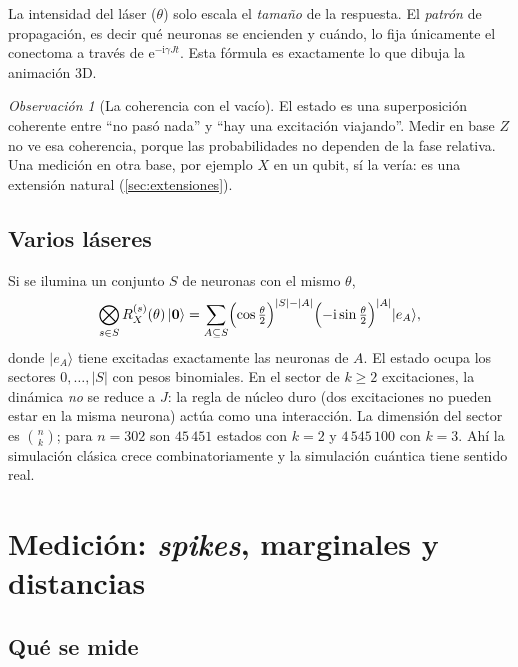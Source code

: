 \documentclass[11pt,a4paper]{article}
\renewcommand{\ket}[1]{\lvert #1\rangle}
\newcommand{\vac}{\ket{\mathbf{0}}}
\newcommand{\e}{\mathrm{e}}
\newcommand{\ii}{\mathrm{i}}
\newcommand{\RX}{R_X}
\theoremstyle{plain}
\theoremstyle{definition}
\theoremstyle{remark}
\newtheorem*{observacion}{Observación}
\begin{document}
\begin{idea}
La intensidad del láser ($\theta$) solo escala el \emph{tamaño} de la respuesta. El \emph{patrón} de propagación, es decir qué neuronas se encienden y cuándo, lo fija únicamente el conectoma a través de $\e^{-\ii\gamma Jt}$. Esta fórmula es exactamente lo que dibuja la animación 3D.
\end{idea}

\begin{observacion}[La coherencia con el vacío]
El estado es una superposición coherente entre ``no pasó nada'' y ``hay una excitación viajando''. Medir en base $Z$ no ve esa coherencia, porque las probabilidades no dependen de la fase relativa. Una medición en otra base, por ejemplo $X$ en un qubit, sí la vería: es una extensión natural (\cref{sec:extensiones}).
\end{observacion}

\subsection{Varios láseres}
\label{subsec:varios-laseres}

Si se ilumina un conjunto $S$ de neuronas con el mismo $\theta$,
\begin{equation}
\bigotimes_{s\in S}\RX^{(s)}(\theta)\,\vac
= \sum_{A\subseteq S}\Bigl(\cos\tfrac\theta2\Bigr)^{|S|-|A|}\Bigl(-\ii\sin\tfrac\theta2\Bigr)^{|A|}\ket{e_A},
\end{equation}
donde $\ket{e_A}$ tiene excitadas exactamente las neuronas de $A$. El estado ocupa los sectores $0,\dots,|S|$ con pesos binomiales. En el sector de $k\ge2$ excitaciones, la dinámica \emph{no} se reduce a $J$: la regla de núcleo duro (dos excitaciones no pueden estar en la misma neurona) actúa como una interacción. La dimensión del sector es $\binom nk$; para $n=302$ son $45\,451$ estados con $k=2$ y $4\,545\,100$ con $k=3$. Ahí la simulación clásica crece combinatoriamente y la simulación cuántica tiene sentido real.

\section{Medición: \emph{spikes}, marginales y distancias}
\label{sec:medicion}

\subsection{Qué se mide}
\end{document}
